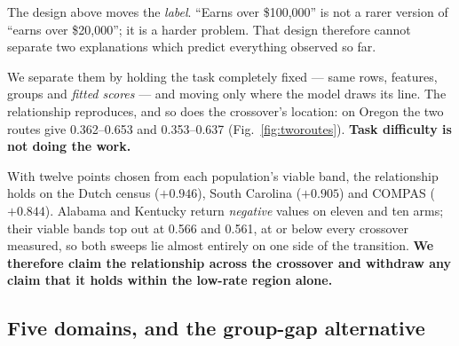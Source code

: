 \documentclass[9pt,conference]{IEEEtran}
\begin{document}
The design above moves the \emph{label}. ``Earns over \$100{,}000'' is not a rarer version of
``earns over \$20{,}000''; it is a harder problem. That design therefore cannot separate two
explanations which predict everything observed so far.

We separate them by holding the task completely fixed --- same rows, features, groups and
\emph{fitted scores} --- and moving only where the model draws its line. The relationship
reproduces, and so does the crossover's location: on Oregon the two routes give 0.362--0.653
and 0.353--0.637 (Fig.~\ref{fig:tworoutes}). \textbf{Task difficulty is not doing the work.}

With twelve points chosen from each population's viable band, the relationship holds on the
Dutch census ($+0.946$), South Carolina ($+0.905$) and COMPAS ($+0.844$). Alabama and Kentucky
return \emph{negative} values on eleven and ten arms; their viable bands top out at 0.566 and
0.561, at or below every crossover measured, so both sweeps lie almost entirely on one side of
the transition. \textbf{We therefore claim the relationship across the crossover and withdraw
any claim that it holds within the low-rate region alone.}

\subsection{Five domains, and the group-gap alternative}
\end{document}
